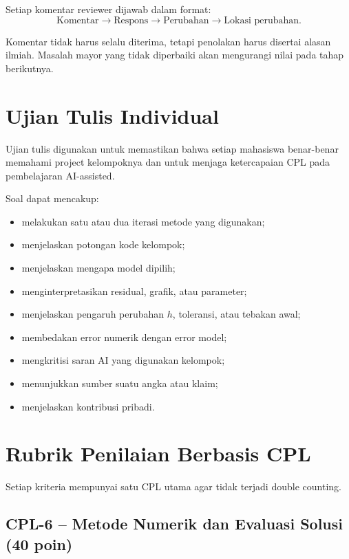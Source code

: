 \documentclass[11pt,a4paper]{article}
\begin{document}
Setiap komentar reviewer dijawab dalam format:
\[
\boxed{\text{Komentar} \rightarrow \text{Respons} \rightarrow \text{Perubahan} \rightarrow \text{Lokasi perubahan}.}
\]

Komentar tidak harus selalu diterima, tetapi penolakan harus disertai alasan ilmiah. Masalah mayor yang tidak diperbaiki akan mengurangi nilai pada tahap berikutnya.

\section{Ujian Tulis Individual}

Ujian tulis digunakan untuk memastikan bahwa setiap mahasiswa benar-benar memahami project kelompoknya dan untuk menjaga ketercapaian CPL pada pembelajaran AI-assisted.

Soal dapat mencakup:
\begin{itemize}
    \item melakukan satu atau dua iterasi metode yang digunakan;
    \item menjelaskan potongan kode kelompok;
    \item menjelaskan mengapa model dipilih;
    \item menginterpretasikan residual, grafik, atau parameter;
    \item menjelaskan pengaruh perubahan $h$, toleransi, atau tebakan awal;
    \item membedakan error numerik dengan error model;
    \item mengkritisi saran AI yang digunakan kelompok;
    \item menunjukkan sumber suatu angka atau klaim;
    \item menjelaskan kontribusi pribadi.
\end{itemize}

\section{Rubrik Penilaian Berbasis CPL}

Setiap kriteria mempunyai satu CPL utama agar tidak terjadi double counting.

\subsection{CPL-6 -- Metode Numerik dan Evaluasi Solusi (40 poin)}
\end{document}
